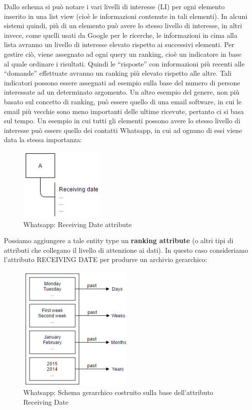 Dallo schema si può notare i vari livelli di interesse (LI) per ogni elemento inserito in una list view (cioè le informazioni contenute in tali elementi). In alcuni sistemi quindi, più di un elemento può avere lo stesso livello di interesse, in altri invece, come quelli usati da Google per le ricerche, le informazioni in cima alla lista avranno un livello di interesse elevato rispetto ai successivi elementi. 
Per gestire ciò, viene assegnato ad ogni query un ranking, cioè un indicatore in base al quale ordinare i risultati. Quindi le “risposte” con informazioni più recenti alle “domande” effettuate avranno un ranking più elevato rispetto alle altre. Tali indicatori possono essere assegnati ad esempio sulla base del numero di persone interessate ad un determinato argomento. Un altro esempio del genere, non più basato sul concetto di ranking, può essere quello di una email software, in cui le email più vecchie sono meno importanti delle ultime ricevute, pertanto ci si basa sul tempo.  
Un esempio in cui tutti gli elementi possono avere lo stesso livello di interesse può essere quello dei contatti Whatsapp, in cui ad ognuno di essi viene data la stessa importanza:

\begin{center}
\begin{figure}[H]
\centering
\includegraphics[scale=1]{figures/whatsapp_rd.png}
\caption{Whatsapp: Receiving Date attribute}
\end{figure}
\end{center}

Possiamo aggiungere a tale entity type un \textbf{ranking attribute} (o altri tipi di attributi che collegano il livello di attenzione ai dati). In questo caso consideriamo l’attributo RECEIVING DATE per produrre un archivio gerarchico: 

\begin{center}
\begin{figure}[H]
\centering
\includegraphics[scale=1]{figures/hierarchical_rd.png}
\caption{Whatsapp: Schema gerarchico costruito sulla base dell'attributo Receiving Date}
\end{figure}
\end{center}

